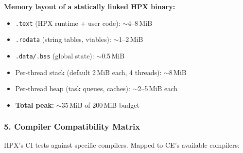 \documentclass[11pt, a4paper]{article}
\newcommand{\code}[1]{\texttt{#1}}
\begin{document}
\textbf{Memory layout of a statically linked HPX binary:}
\begin{itemize}[leftmargin=2em, itemsep=1pt]
  \item \code{.text} (HPX runtime + user code): $\sim$4--8\,MiB
  \item \code{.rodata} (string tables, vtables): $\sim$1--2\,MiB
  \item \code{.data/.bss} (global state): $\sim$0.5\,MiB
  \item Per-thread stack (default 2\,MiB each, 4 threads): $\sim$8\,MiB
  \item Per-thread heap (task queues, caches): $\sim$2--5\,MiB each
  \item \textbf{Total peak:} $\sim$35\,MiB of 200\,MiB budget
\end{itemize}

\subsubsection*{5. Compiler Compatibility Matrix}

HPX's CI tests against specific compilers.  Mapped to CE's available
compilers:
\end{document}

